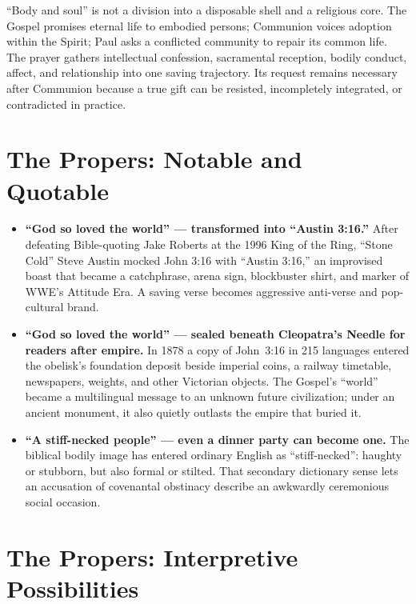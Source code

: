 \begin{deepstudy}
“Body and soul” is not a division into a disposable shell and a religious core. The Gospel promises eternal life to embodied persons; Communion voices adoption within the Spirit; Paul asks a conflicted community to repair its common life. The prayer gathers intellectual confession, sacramental reception, bodily conduct, affect, and relationship into one saving trajectory. Its request remains necessary after Communion because a true gift can be resisted, incompletely integrated, or contradicted in practice.

\clearpage
\section*{The Propers: Notable and Quotable}

{\small
\begin{itemize}[itemsep=0em,topsep=0.15em,parsep=0pt]
\item \textbf{“God so loved the world” --- transformed into “Austin 3:16.”\enspace{}} After defeating Bible-quoting Jake Roberts at the 1996 King of the Ring, “Stone Cold” Steve Austin mocked John 3:16 with “Austin 3:16,” an improvised boast that became a catchphrase, arena sign, blockbuster shirt, and marker of WWE's Attitude Era. A saving verse becomes aggressive anti-verse and pop-cultural brand.

\item \textbf{“God so loved the world” --- sealed beneath Cleopatra's Needle for readers after empire.\enspace{}} In 1878 a copy of John~3:16 in 215 languages entered the obelisk's foundation deposit beside imperial coins, a railway timetable, newspapers, weights, and other Victorian objects. The Gospel's “world” became a multilingual message to an unknown future civilization; under an ancient monument, it also quietly outlasts the empire that buried it.

\item \textbf{“A stiff-necked people” --- even a dinner party can become one.\enspace{}} The biblical bodily image has entered ordinary English as “stiff-necked”: haughty or stubborn, but also formal or stilted. That secondary dictionary sense lets an accusation of covenantal obstinacy describe an awkwardly ceremonious social occasion.
\end{itemize}
}

\section*{The Propers: Interpretive Possibilities}


\end{deepstudy}
